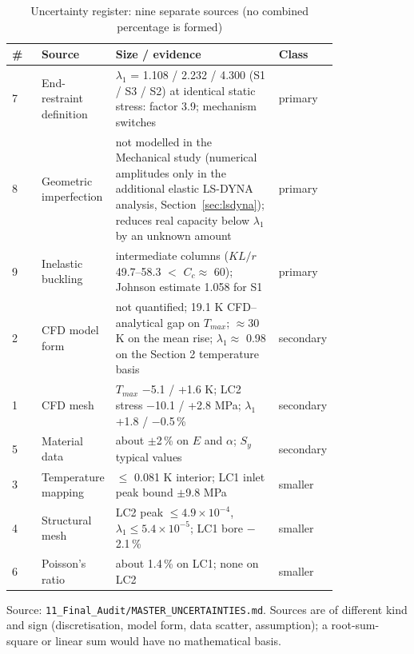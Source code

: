 \begin{table}[htbp]
\centering
\footnotesize
\caption{Uncertainty register: nine separate sources (no combined percentage is formed)}
\label{tab:unc}
\begin{tabular}{l>{\raggedright\arraybackslash}p{0.20\linewidth}>{\raggedright\arraybackslash}p{0.50\linewidth}>{\raggedright\arraybackslash}p{0.11\linewidth}}
\toprule
\# & Source & Size / evidence & Class \\
\midrule
7 & End-restraint definition & $\lambda_1$ = 1.108 / 2.232 / 4.300 (S1 / S3 / S2) at identical static stress: factor 3.9; mechanism switches & primary \\
8 & Geometric imperfection & not modelled in the Mechanical study (numerical amplitudes only in the additional elastic LS-DYNA analysis, Section~\ref{sec:lsdyna}); reduces real capacity below $\lambda_1$ by an unknown amount & primary \\
9 & Inelastic buckling & intermediate columns ($KL/r$ 49.7--58.3 $<$ $C_c \approx$ 60); Johnson estimate 1.058 for S1 & primary \\
2 & CFD model form & not quantified; 19.1 K CFD--analytical gap on $T_{max}$; $\approx$30 K on the mean rise; $\lambda_1 \approx$ 0.98 on the Section 2 temperature basis & secondary \\
1 & CFD mesh & $T_{max}$ $-$5.1 / +1.6 K; LC2 stress $-$10.1 / +2.8 MPa; $\lambda_1$ +1.8 / $-$0.5\,\% & secondary \\
5 & Material data & about $\pm$2\,\% on $E$ and $\alpha$; $S_y$ typical values & secondary \\
3 & Temperature mapping & $\le$ 0.081 K interior; LC1 inlet peak bound $\pm$9.8 MPa & smaller \\
4 & Structural mesh & LC2 peak $\le 4.9\times10^{-4}$, $\lambda_1 \le 5.4\times10^{-5}$; LC1 bore $-$2.1\,\% & smaller \\
6 & Poisson's ratio & about 1.4\,\% on LC1; none on LC2 & smaller \\
\bottomrule
\end{tabular}
\par\smallskip\parbox{\linewidth}{\footnotesize\raggedright Source: \texttt{11\_Final\_Audit/MASTER\_UNCERTAINTIES.md}. Sources are of different kind and sign (discretisation, model form, data scatter, assumption); a root-sum-square or linear sum would have no mathematical basis.}
\end{table}

